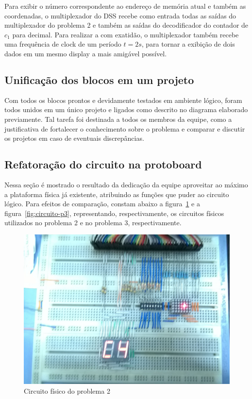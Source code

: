 \documentclass[12pt]{article}
\begin{document}
Para exibir o número correspondente ao endereço de memória atual e também as coordenadas, o multiplexador do DSS recebe como entrada todas as saídas do multiplexador do problema 2 e também as saídas do decodificador do contador de $c_{1}$ para decimal. Para realizar a com exatidão, o multiplexador também recebe uma frequência de clock de um período $t=2s$, para tornar a exibição de dois dados em um mesmo display a mais amigável possível.

\subsection{Unificação dos blocos em um projeto}
Com todos os blocos prontos e devidamente testados em ambiente lógico, foram todos unidos em um único projeto e ligados como descrito no diagrama elaborado previamente. Tal tarefa foi destinada a todos os membros da equipe, como a justificativa de fortalecer o conhecimento sobre o problema e comparar e discutir os projetos em caso de eventuais discrepâncias.

\subsection{Refatoração do circuito na protoboard}

Nessa seção é mostrado o resultado da dedicação da equipe aproveitar ao máximo a plataforma física já existente, atribuindo as funções que puder ao circuito lógico. Para efeitos de comparação, constam abaixo a figura~\ref{fig:circuito-p2} e a figura~\ref{fig:circuito-p3}, representando, respectivamente, os circuitos físicos utilizados no problema 2 e no problema 3, respectivamente.

\begin{figure}[!htbp]
\centering
\includegraphics[width=.9\textwidth]{img/circuito-p2.jpg}
\caption{Circuito físico do problema 2}
\label{fig:circuito-p2}
\end{figure}
\end{document}
